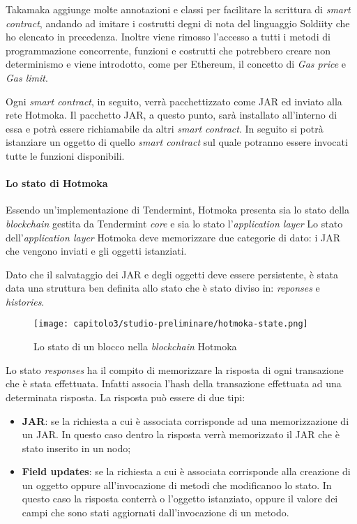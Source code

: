 Takamaka aggiunge molte annotazioni e classi per facilitare la scrittura di \textit{smart contract}, andando ad imitare i costrutti degni di nota del linguaggio Soldiity che ho elencato in precedenza. Inoltre viene rimosso l'accesso a tutti i metodi di programmazione concorrente, funzioni e costrutti che potrebbero creare non determinismo e viene introdotto, come per Ethereum, il concetto di \textit{Gas price} e \textit{Gas limit}. 

Ogni \textit{smart contract}, in seguito, verrà pacchettizzato come JAR ed inviato alla rete Hotmoka. Il pacchetto JAR, a questo punto, sarà installato all'interno di essa e potrà essere richiamabile da altri \textit{smart contract}. 
In seguito si potrà istanziare un oggetto di quello \textit{smart contract} sul quale potranno essere invocati tutte le funzioni disponibili.

\paragraph{Lo stato di Hotmoka}
Essendo un'implementazione di Tendermint, Hotmoka presenta sia lo stato della \textit{blockchain} gestita da Tendermint \textit{core} e sia lo stato l'\textit{application layer} 
Lo stato dell'\textit{application layer} Hotmoka deve memorizzare due categorie di dato: i JAR che vengono inviati e gli oggetti istanziati.

Dato che il salvataggio dei JAR e degli oggetti deve essere persistente, è stata data una struttura ben definita allo stato che è stato diviso in: \textit{reponses} e \textit{histories}.

\begin{figure}[h!]
  \centering
  \texttt{[image: capitolo3/studio-preliminare/hotmoka-state.png]}
  \caption{Lo stato di un blocco nella \textit{blockchain} Hotmoka}
\end{figure}

Lo stato \textit{responses} ha il compito di memorizzare la risposta di ogni transazione che è stata effettuata. Infatti associa l'hash della transazione effettuata ad una determinata risposta. 
La risposta può essere di due tipi:
\begin{itemize}
  \item \textbf{JAR}: se la richiesta a cui è associata corrisponde ad una memorizzazione di un JAR. In questo caso dentro la risposta verrà memorizzato il JAR che è stato inserito in un nodo;
  \item \textbf{Field updates}: se la richiesta a cui è associata corrisponde alla creazione di un oggetto oppure all'invocazione di metodi che modificanoo lo stato. In questo caso la risposta conterrà o l'oggetto istanziato, oppure il valore dei campi che sono stati aggiornati dall'invocazione di un metodo.
\end{itemize}

